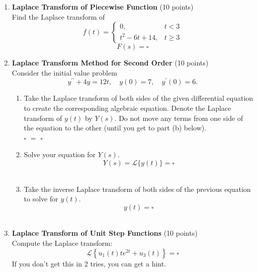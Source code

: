\begin{enumerate}
  \newpage

  \item \textbf{Laplace Transform of Piecewise Function} (10 points)\\
  Find the Laplace transform of
  $$
  f(t)= \begin{cases}0, & t<3 \\ t^2-6 t+14, & t \geq 3\end{cases}
  $$
  $$
  F(s)=\square
  $$
  \begin{subanswer}
  \end{subanswer}

  \item \textbf{Laplace Transform Method for Second Order} (10 points)\\
  Consider the initial value problem
  $$
  y^{\prime \prime}+4 y=12 t, \quad y(0)=7, \quad y^{\prime}(0)=6 .
  $$
  \begin{enumerate}[label=(\alph*)]
    \item Take the Laplace transform of both sides of the given differential 
    equation to create the corresponding algebraic equation. Denote the 
    Laplace transform of $y(t)$ by $Y(s)$. Do not move any terms from 
    one side of the equation to the other (until you get to part (b) below).\\
    $\square$ $=$ $\square$\\
    \begin{subanswer}
    \end{subanswer}
    \item Solve your equation for $Y(s)$.\\
    $$
    Y(s)=\mathcal{L}\{y(t)\}=\square
    $$\\
    \begin{subanswer}
    \end{subanswer}
    \item Take the inverse Laplace transform of both sides of the previous equation to solve for $y(t)$.\\
    $$
    y(t)=\square
    $$\\
    \begin{subanswer}
    \end{subanswer}
  \end{enumerate}

  \item \textbf{Laplace Transform of Unit Step Functions} (10 points)\\
  Compute the Laplace transform:
  $$
  \mathcal{L}\left\{u_1(t) t e^{2 t}+u_3(t)\right\}=\square
  $$
  If you don't get this in 2 tries, you can get a hint.\\
  \begin{subanswer}
  \end{subanswer}


\end{enumerate}

